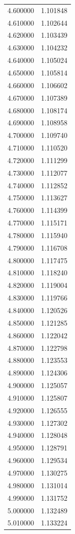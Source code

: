 \begin{tabular}{rr}
4.600000 & 1.101848 \\
4.610000 & 1.102644 \\
4.620000 & 1.103439 \\
4.630000 & 1.104232 \\
4.640000 & 1.105024 \\
4.650000 & 1.105814 \\
4.660000 & 1.106602 \\
4.670000 & 1.107389 \\
4.680000 & 1.108174 \\
4.690000 & 1.108958 \\
4.700000 & 1.109740 \\
4.710000 & 1.110520 \\
4.720000 & 1.111299 \\
4.730000 & 1.112077 \\
4.740000 & 1.112852 \\
4.750000 & 1.113627 \\
4.760000 & 1.114399 \\
4.770000 & 1.115171 \\
4.780000 & 1.115940 \\
4.790000 & 1.116708 \\
4.800000 & 1.117475 \\
4.810000 & 1.118240 \\
4.820000 & 1.119004 \\
4.830000 & 1.119766 \\
4.840000 & 1.120526 \\
4.850000 & 1.121285 \\
4.860000 & 1.122042 \\
4.870000 & 1.122798 \\
4.880000 & 1.123553 \\
4.890000 & 1.124306 \\
4.900000 & 1.125057 \\
4.910000 & 1.125807 \\
4.920000 & 1.126555 \\
4.930000 & 1.127302 \\
4.940000 & 1.128048 \\
4.950000 & 1.128791 \\
4.960000 & 1.129534 \\
4.970000 & 1.130275 \\
4.980000 & 1.131014 \\
4.990000 & 1.131752 \\
5.000000 & 1.132489 \\
5.010000 & 1.133224 \\

\end{tabular}
